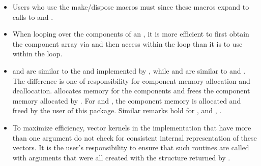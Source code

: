            
\begin{itemize}
                                        
\item
  Users who use the make/dispose macros must                 
   since these macros expand to calls to     
   and .                                             
  
\item
  When looping over the components of an  , it is     
  more efficient to first obtain the component array via       
   and then access  within the     
  loop than it is to use  within the loop.        
                                     
\item                          
   and  are similar to the  and  
   implemented by {\nvecs}, while  and 
    are similar to   and . 
  The difference is one of responsibility for component memory     
  allocation and deallocation.  allocates memory  
  for the  components and  frees the     
  component memory allocated by . For    
  and , the component memory is allocated and      
  freed by the user of this package. Similar remarks hold for  
  ,   and ,              
  .                                            

\item
  To maximize efficiency, vector kernels in the {\nvecs} implementation
  that have more than one  argument do not check for
  consistent internal representation of these vectors. It is the user's 
  responsibility to ensure that such routines are called with 
  arguments that were all created with the  structure returned
  by .

\end{itemize}
